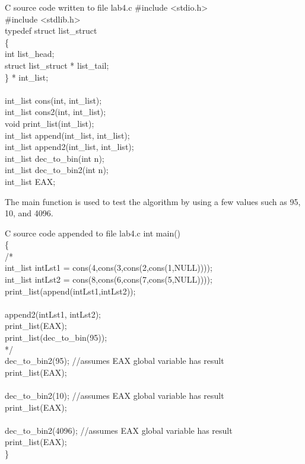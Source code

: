 \documentclass{article}
\begin{document}
\begin{GFT}{C source code written to file lab4.c}
\+\#include <stdio.h>\\
\+\#include <stdlib.h>\\
\+typedef struct list\_struct\\
\+\{\\
\+  int list\_head;\\
\+  struct list\_struct * list\_tail;\\
\+\} * int\_list;\\
\+\\
\+int\_list cons(int, int\_list);\\
\+int\_list cons2(int, int\_list);\\
\+void print\_list(int\_list);\\
\+int\_list append(int\_list, int\_list);\\
\+int\_list append2(int\_list, int\_list);\\
\+int\_list dec\_to\_bin(int n);\\
\+int\_list dec\_to\_bin2(int n);\\
\+int\_list EAX;\\
\end{GFT}
\pagebreak
The main function is used to test the algorithm by using a few values such as 95, 10, and 4096.
\begin{GFT}{C source code appended to file lab4.c}
\+int main()\\
\+\{\\
\+ /*\\
\+  int\_list intLst1 = cons(4,cons(3,cons(2,cons(1,NULL))));\\
\+  int\_list intLst2 = cons(8,cons(6,cons(7,cons(5,NULL))));\\
\+  print\_list(append(intLst1,intLst2)); \\
\+\\
\+  append2(intLst1, intLst2);\\
\+  print\_list(EAX);\\
\+  print\_list(dec\_to\_bin(95));\\
\+  */\\
\+  dec\_to\_bin2(95); //assumes EAX global variable has result\\
\+  print\_list(EAX);\\
\+\\
\+  dec\_to\_bin2(10); //assumes EAX global variable has result\\
\+  print\_list(EAX);\\
\+\\
\+  dec\_to\_bin2(4096); //assumes EAX global variable has result\\
\+  print\_list(EAX);\\
\+\}\\
\+\\
\end{GFT}
\end{document}
